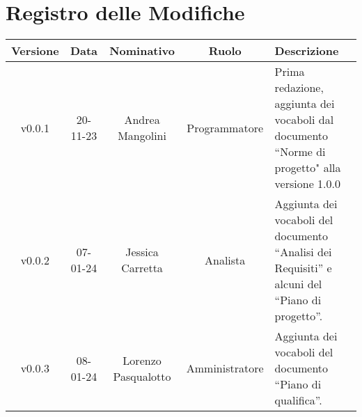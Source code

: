 \section*{\Large Registro delle Modifiche}
    \begin{table}[h]
        \centering
        \renewcommand\tabularxcolumn[1]{m{#1}} %
        \renewcommand{\arraystretch}{1.5}
        \begin{tabularx}{0.98\textwidth}
            {c|c|c|c|>{\centering\arraybackslash}X}
            \rowcolor{black}
            \textbf{\color{white} Versione} & \textbf{\color{white} Data} & \textbf{\color{white} Nominativo} & \textbf{\color{white} Ruolo} & \textbf{\color{white} Descrizione} \\ 
            \hline

            v0.0.1 & 20-11-23 & Andrea Mangolini & Programmatore & Prima redazione, aggiunta dei vocaboli dal documento ``Norme di progetto" alla versione 1.0.0 \\
            v0.0.2 & 07-01-24 & Jessica Carretta & Analista & Aggiunta dei vocaboli del documento ``Analisi dei Requisiti'' e alcuni del ``Piano di progetto''. \\
            v0.0.3 & 08-01-24 & Lorenzo Pasqualotto & Amministratore & Aggiunta dei vocaboli del documento ``Piano di qualifica''. \\
            \hline
        \end{tabularx}
    \end{table}